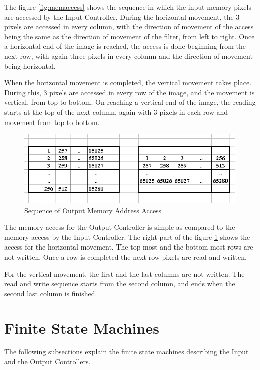 \documentclass[11pt,a4paper]{article}
\begin{document}
\FloatBarrier

The figure \ref{fig:memaccess} shows the sequence in which the input memory pixels are accessed by the Input Controller. During the horizontal movement, the 3 pixels are accessed in every column, with the direction of movement of the access being the same as the direction of movement of the filter, from left to right. Once a horizontal end of the image is reached, the access is done beginning from the next row, with again three pixels in every column and the direction of movement being horizontal. 

When the horizontal movement is completed, the vertical movement takes place. During this, 3 pixels are accessed in every row of the image, and the movement is vertical, from top to bottom. On reaching a vertical end of the image, the reading starts at the top of the next column, again with 3 pixels in each row and movement from top to bottom.

\begin{figure}[h]
	\centering
		\includegraphics[width=5in]{./images/outmemoryaccess.jpg}
	\caption{Sequence of Output Memory Address Access}	
	\label{fig:outmemaccess}
\end{figure}
\FloatBarrier

The memory access for the Output Controller is simple as compared to the memory access by the Input Controller. The right part of the figure \ref{fig:outmemaccess} shows the access for the horizontal movement. The top most and the bottom most rows are not written. Once a row is completed the next row pixels are read and written.

For the vertical movement, the first and the last columns are not written. The read and write sequence starts from the second column, and ends when the second last column is finished.


\section{Finite State Machines}
\label{sec:controller}

The following subsections explain the finite state machines describing the Input and the Output Controllers.
\end{document}
